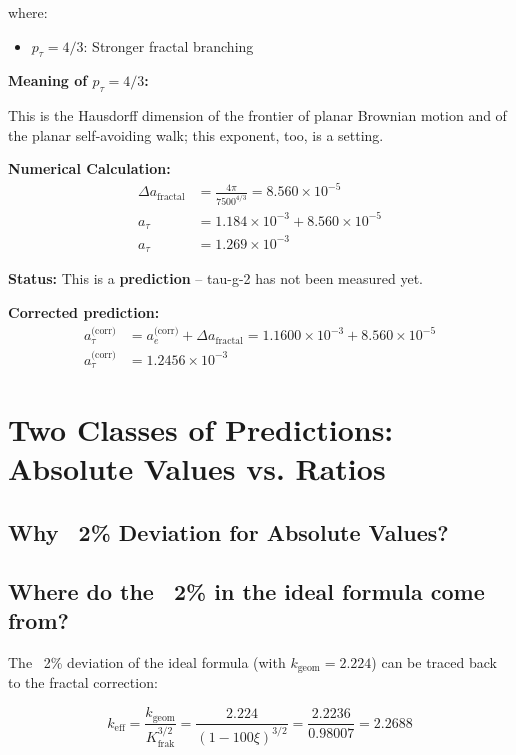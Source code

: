 	where:
	\begin{itemize}
		\item $p_\tau = 4/3$: Stronger fractal branching
	\end{itemize}
	
	\textbf{Meaning of $p_\tau = 4/3$:}
	
	This is the Hausdorff dimension of the frontier of planar Brownian motion and of the planar self-avoiding walk; this exponent, too, is a setting.
	
	\textbf{Numerical Calculation:}
	\begin{align}
		\Delta a_{\text{fractal}} &= \frac{4\pi}{7500^{4/3}} = 8.560 \times 10^{-5} \\
		a_\tau &= 1.184 \times 10^{-3} + 8.560 \times 10^{-5} \\
		a_\tau &= 1.269 \times 10^{-3}
	\end{align}
	
	\textbf{Status:} This is a \textbf{prediction} – tau-g-2 has not been measured yet.
	
	\textbf{Corrected prediction:}
	\begin{align}
		a_\tau^\text{(corr)} &= a_e^\text{(corr)} + \Delta a_\text{fractal} = 1.1600 \times 10^{-3} + 8.560 \times 10^{-5} \\
		a_\tau^\text{(corr)} &= 1.2456 \times 10^{-3}
	\end{align}
	
	\section{Two Classes of Predictions: Absolute Values vs. Ratios}
	
	\subsection{Why ~2\% Deviation for Absolute Values?}
	
	\subsection{Where do the ~2\% in the ideal formula come from?}
	
	The ~2\% deviation of the ideal formula (with $k_\text{geom} = 2.224$) can be traced back to the fractal correction:
	
	\begin{equation}
		k_\text{eff} = \frac{k_\text{geom}}{K_\text{frak}^{3/2}} = \frac{2.224}{(1-100\xi)^{3/2}} = \frac{2.2236}{0.98007} = 2.2688
	\end{equation}
	
